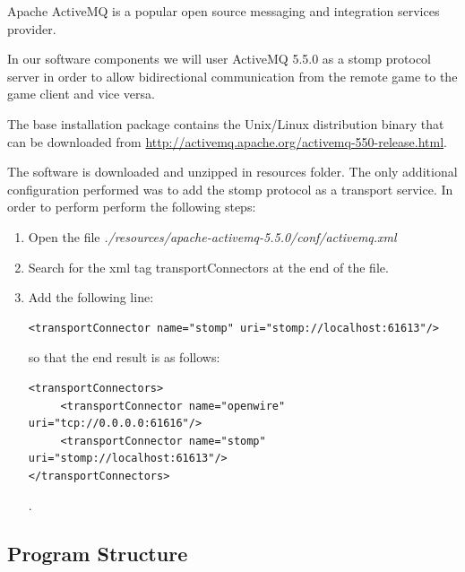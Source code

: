 \documentclass[a4paper,10pt,titlepage]{article}
\begin{document}
\par Apache ActiveMQ is a popular open source messaging and integration services provider.

\par In our software components we will user ActiveMQ 5.5.0 as a stomp protocol server in order to allow bidirectional communication from the remote game to the game client and vice versa.

\par The base installation package contains the Unix/Linux distribution binary that can be downloaded from \url{http://activemq.apache.org/activemq-550-release.html}.

\par The software is downloaded and unzipped in resources folder. The only additional configuration performed was to add the stomp protocol as a transport service. In order to perform perform the following steps:
\begin{enumerate}
	\item Open the file \textit{./resources/apache-activemq-5.5.0/conf/activemq.xml}
	\item Search for the xml tag transportConnectors at the end of the file.
	\item Add the following line: \begin{verbatim}<transportConnector name="stomp" uri="stomp://localhost:61613"/> \end{verbatim} so that the end result is as follows:
\begin{verbatim}
<transportConnectors>
     <transportConnector name="openwire" uri="tcp://0.0.0.0:61616"/>
     <transportConnector name="stomp" uri="stomp://localhost:61613"/>
</transportConnectors>
\end{verbatim}. 
\end{enumerate}

\subsection{Program Structure}
\end{document}
